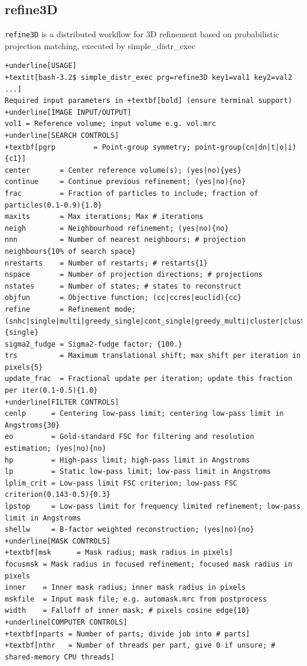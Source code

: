 \documentclass[a4paper,11pt]{article}
\newcommand{\prgname}[1]{\textcolor{NavyBlue}{\texttt{#1}}}
\begin{document}
\subsection{refine3D}
\label{refine3D}
\prgname{refine3D} is a distributed workflow for 3D refinement based on probabilistic projection matching, executed by simple\_distr\_exec
\begin{Verbatim}[commandchars=+\[\],fontsize=\small,breaklines=true]
+underline[USAGE]
+textit[bash-3.2$ simple_distr_exec prg=refine3D key1=val1 key2=val2 ...]
Required input parameters in +textbf[bold] (ensure terminal support)
+underline[IMAGE INPUT/OUTPUT]
vol1 = Reference volume; input volume e.g. vol.mrc
+underline[SEARCH CONTROLS]
+textbf[pgrp         = Point-group symmetry; point-group(cn|dn|t|o|i){c1}]
center       = Center reference volume(s); (yes|no){yes}
continue     = Continue previous refinement; (yes|no){no}
frac         = Fraction of particles to include; fraction of particles(0.1-0.9){1.0}
maxits       = Max iterations; Max # iterations
neigh        = Neighbourhood refinement; (yes|no){no}
nnn          = Number of nearest neighbours; # projection neighbours{10% of search space}
nrestarts    = Number of restarts; # restarts{1}
nspace       = Number of projection directions; # projections
nstates      = Number of states; # states to reconstruct
objfun       = Objective function; (cc|ccres|euclid){cc}
refine       = Refinement mode; (snhc|single|multi|greedy_single|cont_single|greedy_multi|cluster|clustersym){single}
sigma2_fudge = Sigma2-fudge factor; {100.}
trs          = Maximum translational shift; max shift per iteration in pixels{5}
update_frac  = Fractional update per iteration; update this fraction per iter(0.1-0.5){1.0}
+underline[FILTER CONTROLS]
cenlp      = Centering low-pass limit; centering low-pass limit in Angstroms{30}
eo         = Gold-standard FSC for filtering and resolution estimation; (yes|no){no}
hp         = High-pass limit; high-pass limit in Angstroms
lp         = Static low-pass limit; low-pass limit in Angstroms
lplim_crit = Low-pass limit FSC criterion; low-pass FSC criterion(0.143-0.5){0.3}
lpstop     = Low-pass limit for frequency limited refinement; low-pass limit in Angstroms
shellw     = B-factor weighted reconstruction; (yes|no){no}
+underline[MASK CONTROLS]
+textbf[msk      = Mask radius; mask radius in pixels]
focusmsk = Mask radius in focused refinement; focused mask radius in pixels
inner    = Inner mask radius; inner mask radius in pixels
mskfile  = Input mask file; e.g. automask.mrc from postprocess
width    = Falloff of inner mask; # pixels cosine edge{10}
+underline[COMPUTER CONTROLS]
+textbf[nparts = Number of parts; divide job into # parts]
+textbf[nthr   = Number of threads per part, give 0 if unsure; # shared-memory CPU threads]
\end{Verbatim}
\end{document}
